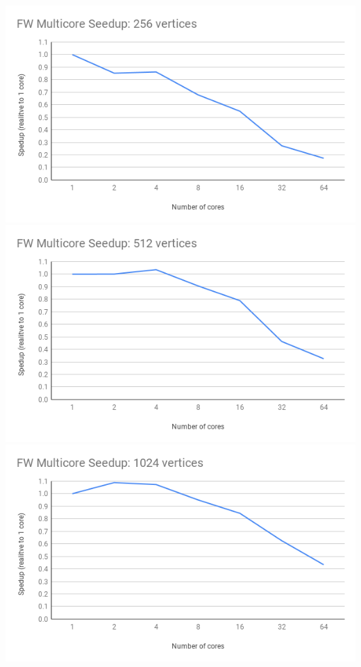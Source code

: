 \documentclass[]{article}
\begin{document}
	\includegraphics[scale=0.5]{graphs/256.png}
	\includegraphics[scale=0.5]{graphs/512.png}
	\includegraphics[scale=0.5]{graphs/1024.png}
\end{document}
